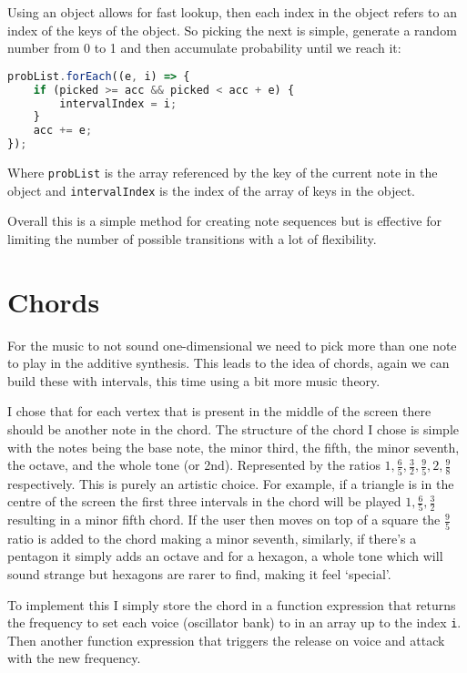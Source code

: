 Using an object allows for fast lookup, then each index in the object refers to
an index of the keys of the object. So picking the next is simple, generate a
random number from 0 to 1 and then accumulate probability until we reach it:

\begin{lstlisting}[language=Javascript]
probList.forEach((e, i) => {
    if (picked >= acc && picked < acc + e) {
        intervalIndex = i;
    }
    acc += e;
});
\end{lstlisting}

Where \verb|probList| is the array referenced by the key of the current note in the
object and \verb|intervalIndex| is the index of the array of keys in the object.

Overall this is a simple method for creating note sequences but is effective for
limiting the number of possible transitions with a lot of flexibility.  

\section{Chords}
For the music to not sound one-dimensional we need to pick more than one note to
play in the additive synthesis. This leads to the idea of chords, again we can
build these with intervals, this time using a bit more music theory. 

I chose that for each vertex that is present in the middle of the screen there
should be another note in the chord. The structure of the chord I chose is
simple with the notes being the base note, the minor third, the fifth, the minor
seventh, the octave, and the whole tone (or 2nd). Represented by the ratios $1,
\frac{6}{5}, \frac{3}{2}, \frac{9}{5}, 2, \frac{9}{8}$ respectively. This is
purely an artistic choice. For example, if a triangle is in the centre of the
screen the first three intervals in the chord will be played $1, \frac{6}{5},
\frac{3}{2}$ resulting in a minor fifth chord. If the user then moves on top of
a square the $\frac{9}{5}$ ratio is added to the chord making a minor seventh,
similarly, if there's a pentagon it simply adds an octave and for a hexagon, a
whole tone which will sound strange but hexagons are rarer to find, making it
feel `special'.

To implement this I simply store the chord in a function expression that returns
the frequency to set each voice (oscillator bank) to in an array up to the index
\verb|i|. Then another function expression that triggers the release on voice
and attack with the new frequency.

